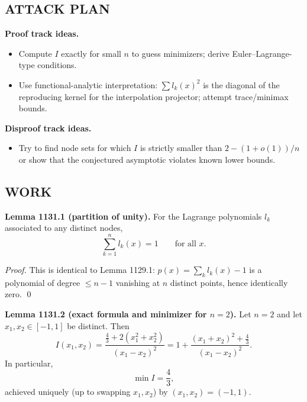 \subsection*{ATTACK PLAN}
\textbf{Proof track ideas.}
\begin{itemize}
\item Compute $I$ exactly for small $n$ to guess minimizers; derive Euler--Lagrange-type conditions.
\item Use functional-analytic interpretation: $\sum l_k(x)^2$ is the diagonal of the reproducing kernel for the interpolation projector; attempt trace/minimax bounds.
\end{itemize}
\textbf{Disproof track ideas.}
\begin{itemize}
\item Try to find node sets for which $I$ is strictly smaller than $2-(1+o(1))/n$ or show that the conjectured asymptotic violates known lower bounds.
\end{itemize}

\subsection*{WORK}
\textbf{Lemma 1131.1 (partition of unity).}
For the Lagrange polynomials $l_k$ associated to any distinct nodes,
\[
\sum_{k=1}^n l_k(x)=1\qquad\text{for all }x.
\]

\emph{Proof.}
This is identical to Lemma 1129.1: $p(x)=\sum_k l_k(x)-1$ is a polynomial of degree $\le n-1$ vanishing at $n$ distinct points, hence identically zero. \qed

\textbf{Lemma 1131.2 (exact formula and minimizer for $n=2$).}
Let $n=2$ and let $x_1,x_2\in[-1,1]$ be distinct.
Then
\[
I(x_1,x_2)=\frac{\frac{4}{3}+2(x_1^2+x_2^2)}{(x_1-x_2)^2}
=1+\frac{(x_1+x_2)^2+\frac{4}{3}}{(x_1-x_2)^2}.
\]
In particular,
\[
\min I = \frac{4}{3},
\]
achieved uniquely (up to swapping $x_1,x_2$) by $(x_1,x_2)=(-1,1)$.

